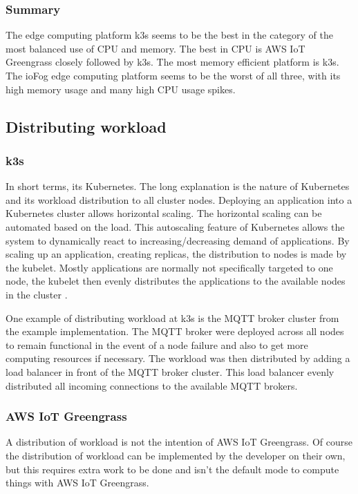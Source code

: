 \subsubsection*{Summary}
The edge computing platform k3s seems to be the best in the category of the most balanced use of CPU and memory. The best in CPU is AWS IoT Greengrass closely followed by k3s. The most memory efficient platform is k3s. The ioFog edge computing platform seems to be the worst of all three, with its high memory usage and many high CPU usage spikes.

\subsection*{Distributing workload}
\subsubsection*{k3s}
In short terms, its Kubernetes. The long explanation is the nature of Kubernetes and its workload distribution to all cluster nodes. Deploying an application into a Kubernetes cluster allows horizontal scaling. The horizontal scaling can be automated based on the load. This autoscaling feature of Kubernetes allows the system to dynamically react to increasing/decreasing demand of applications. By scaling up an application, creating replicas, the distribution to nodes is made by the kubelet. Mostly applications are normally not specifically targeted to one node, the kubelet then evenly distributes the applications to the available nodes in the cluster \cite{TheKubernetesAuthors}. 

\bigskip
One example of distributing workload at k3s is the MQTT broker cluster from the example implementation. The MQTT broker were deployed across all nodes to remain functional in the event of a node failure and also to get more computing resources if necessary. The workload was then distributed by adding a load balancer in front of the MQTT broker cluster. This load balancer evenly distributed all incoming connections to the available MQTT brokers.

\subsubsection*{AWS IoT Greengrass}
A distribution of workload is not the intention of AWS IoT Greengrass. Of course the distribution of workload can be implemented by the developer on their own, but this requires extra work to be done and isn't the default mode to compute things with AWS IoT Greengrass.

